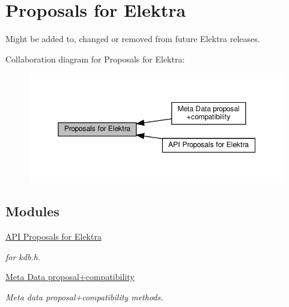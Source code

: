 \hypertarget{group__proposal}{}\section{Proposals for Elektra}
\label{group__proposal}


Might be added to, changed or removed from future Elektra releases.  


Collaboration diagram for Proposals for Elektra\+:
\nopagebreak
\begin{figure}[H]
\begin{center}
\leavevmode
\includegraphics[width=350pt]{group__proposal}
\end{center}
\end{figure}
\subsection*{Modules}
\begin{DoxyCompactItemize}
\item 
\hyperlink{group__api}{A\+P\+I Proposals for Elektra}
\begin{DoxyCompactList}\small\item\em for kdb.\+h. \end{DoxyCompactList}\item 
\hyperlink{group__meta}{Meta Data proposal+compatibility}
\begin{DoxyCompactList}\small\item\em Meta data proposal+compatibility methods. \end{DoxyCompactList}\end{DoxyCompactItemize}

